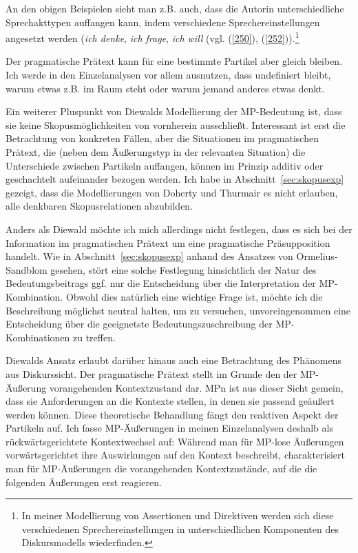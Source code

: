An den obigen Beispielen sieht man z.B. auch, dass die Autorin unterschiedliche Sprechakttypen  auffangen kann, indem verschiedene Sprechereinstellungen  angesetzt werden (\textit{ich denke}, \textit{ich frage}, \textit{ich will} (vgl. (\ref{250}), (\ref{252})).\footnote{In meiner Modellierung von Assertionen und Direktiven werden sich diese verschiedenen Sprechereinstellungen in unterschiedlichen Komponenten des Diskursmodells wiederfinden.}

Der pragmatische Prätext  kann für eine bestimmte Partikel aber gleich bleiben. Ich werde in den Einzelanalysen vor allem ausnutzen, dass undefiniert bleibt, warum etwas z.B. im Raum steht oder warum jemand anderes etwas denkt.

Ein weiterer Pluspunkt von Diewalds Modellierung der MP-Bedeutung ist, dass sie keine Skopusmöglichkeiten von vornherein ausschließt. Interessant ist erst die Betrachtung von konkreten Fällen, aber die Situationen im pragma\-tischen Prätext, die (neben dem Äußerungstyp in der relevanten Situation) die Unterschiede zwischen Partikeln auffangen, können im Prinzip additiv oder geschach\-telt aufeinander bezogen werden. Ich habe in Abschnitt~\ref{sec:skopusexp} gezeigt, dass die Model\-lierungen von Doherty und Thurmair es nicht erlauben, alle denkbaren Skopusrelationen abzubilden.

Anders als Diewald möchte ich mich allerdings nicht festlegen, dass es sich bei der Information im pragmatischen Prätext um eine pragmatische Präsupposition  handelt. Wie in Abschnitt~\ref{sec:skopusexp} anhand des Ansatzes von Ormelius-Sandblom gesehen, stört eine solche Festlegung hinsichtlich der Natur des Bedeutungsbeitrags ggf. nur die Entscheidung über die Interpretation der MP-Kombination. Obwohl dies natürlich eine wichtige Frage ist, möchte ich die Beschreibung mög\-lichst neutral halten, um zu versuchen, unvoreingenommen eine Entscheidung über die geeignetste Bedeutungszuschreibung der MP-Kombinationen zu treffen. 

Diewalds Ansatz erlaubt darüber hinaus auch eine Betrachtung des Phänomens aus Diskurssicht. Der pragmatische Prätext stellt im Grunde den der MP-Äuße\-rung vorangehenden Kontextzustand dar. MPn ist aus dieser Sicht gemein, dass sie Anforderungen an die Kontexte stellen, in denen sie passend geäußert werden können. Diese theoretische Behandlung fängt den reaktiven Aspekt der Partikeln auf. Ich fasse MP-Äußerungen in meinen Einzelanalysen deshalb als \glq rückwärtsgerichtete Kontextwechsel\grq {} auf: Während man für MP-lose Äußerungen vorwärtsgerichtet ihre Auswirkungen auf den Kontext beschreibt, charakte\-risiert man für MP-Äußerungen die vorangehenden Kontextzustände, auf die die folgenden Äußerungen erst reagieren. 

